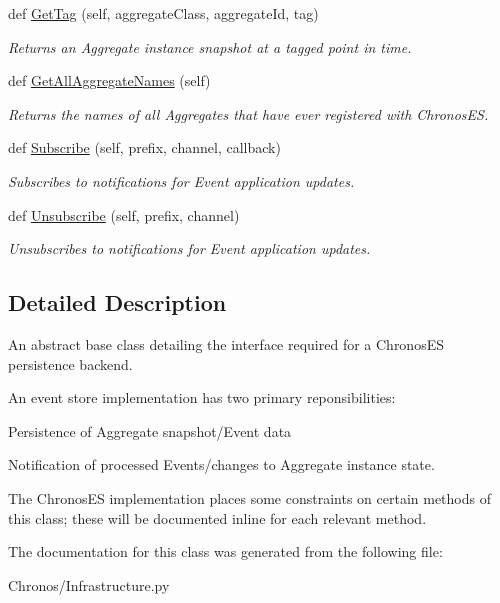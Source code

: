\begin{DoxyCompactItemize}
def \hyperlink{group__Chronos_ga6e7bef46c596b6148c2afd64032c9cc7}{Get\+Tag} (self, aggregate\+Class, aggregate\+Id, tag)
\begin{DoxyCompactList}\small\item\em Returns an Aggregate instance snapshot at a tagged point in time. \end{DoxyCompactList}\item 
def \hyperlink{group__Chronos_ga8c99114f487e0549eefe4b754d06ffa0}{Get\+All\+Aggregate\+Names} (self)
\begin{DoxyCompactList}\small\item\em Returns the names of all Aggregates that have ever registered with Chronos\+ES. \end{DoxyCompactList}\item 
def \hyperlink{group__Chronos_gab7cf7e29ee38e091d177b793abdc8b0c}{Subscribe} (self, prefix, channel, callback)
\begin{DoxyCompactList}\small\item\em Subscribes to notifications for Event application updates. \end{DoxyCompactList}\item 
def \hyperlink{group__Chronos_ga5d1257300d4e388a5061d8ffec6f1ff2}{Unsubscribe} (self, prefix, channel)
\begin{DoxyCompactList}\small\item\em Unsubscribes to notifications for Event application updates. \end{DoxyCompactList}\end{DoxyCompactItemize}


\subsection{Detailed Description}
An abstract base class detailing the interface required for a Chronos\+ES persistence backend. 

An event store implementation has two primary reponsibilities\+:
\begin{DoxyEnumerate}
\item Persistence of Aggregate snapshot/\+Event data
\item Notification of processed Events/changes to Aggregate instance state.
\end{DoxyEnumerate}

The Chronos\+ES implementation places some constraints on certain methods of this class; these will be documented inline for each relevant method. 

The documentation for this class was generated from the following file\+:\begin{DoxyCompactItemize}
\item 
Chronos/Infrastructure.\+py\end{DoxyCompactItemize}
